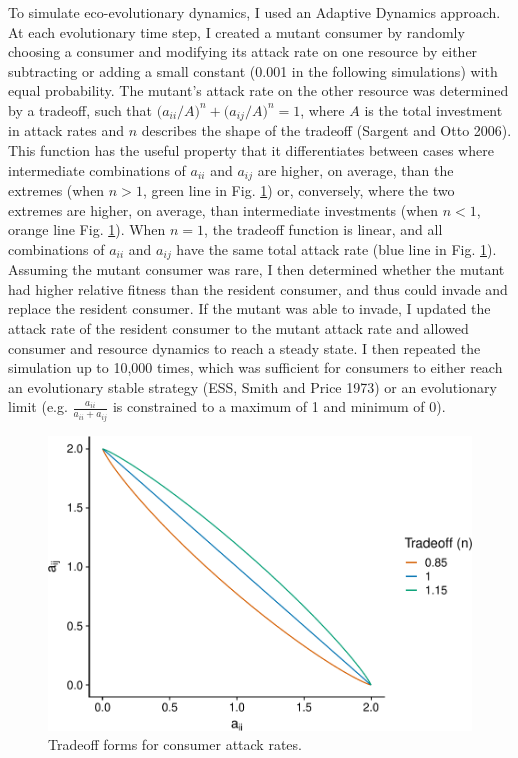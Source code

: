 \documentclass[11pt,]{article}
\begin{document}
To simulate eco-evolutionary dynamics, I used an Adaptive Dynamics
approach. At each evolutionary time step, I created a mutant consumer by
randomly choosing a consumer and modifying its attack rate on one
resource by either subtracting or adding a small constant (0.001 in the
following simulations) with equal probability. The mutant's attack rate
on the other resource was determined by a tradeoff, such that
\(\big(a_{ii}/{A}\big)^n+\big(a_{ij}/{A}\big)^n=1\), where \(A\) is the
total investment in attack rates and \(n\) describes the shape of the
tradeoff (Sargent and Otto 2006). This function has the useful property
that it differentiates between cases where intermediate combinations of
\(a_{ii}\) and \(a_{ij}\) are higher, on average, than the extremes
(when \(n>1\), green line in Fig. \ref{fig:Tradeoff}) or, conversely,
where the two extremes are higher, on average, than intermediate
investments (when \(n<1\), orange line Fig. \ref{fig:Tradeoff}). When
\(n=1\), the tradeoff function is linear, and all combinations of
\(a_{ii}\) and \(a_{ij}\) have the same total attack rate (blue line in
Fig. \ref{fig:Tradeoff}). Assuming the mutant consumer was rare, I then
determined whether the mutant had higher relative fitness than the
resident consumer, and thus could invade and replace the resident
consumer. If the mutant was able to invade, I updated the attack rate of
the resident consumer to the mutant attack rate and allowed consumer and
resource dynamics to reach a steady state. I then repeated the
simulation up to 10,000 times, which was sufficient for consumers to
either reach an evolutionary stable strategy (ESS, Smith and Price 1973)
or an evolutionary limit (e.g. \(\frac{a_{ii}}{a_{ii}+a_{ij}}\) is
constrained to a maximum of 1 and minimum of 0).

\begin{figure}
\centering
\includegraphics{manuscript_ECD_model_files/figure-latex/Tradeoff-1.pdf}
\caption{\label{fig:Tradeoff}Tradeoff forms for consumer attack rates.}
\end{figure}
\end{document}
